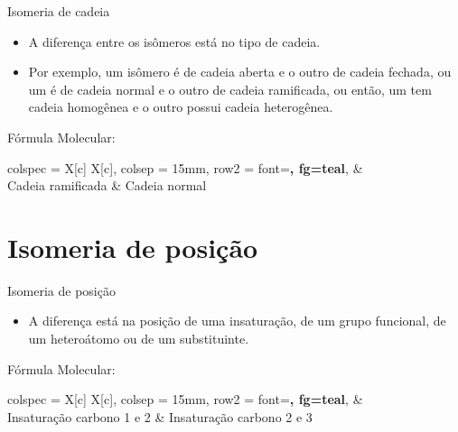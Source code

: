 \documentclass[presentation,professionalfonts,aspectratio=169]{beamer}
\begin{document}
\begin{frame}[label={sec:org221f0c5}]{Isomeria de cadeia}
\begin{itemize}
\item A diferença entre os isômeros está no tipo de cadeia.
\item Por exemplo, um isômero é de cadeia aberta e o outro de cadeia fechada, ou um é de cadeia normal e o outro de cadeia ramificada, ou então, um tem cadeia homogênea e o outro possui cadeia heterogênea.
\end{itemize}




\begin{bclogo}[couleur=yellow!30 , arrondi=0.1 , logo=\bcplume , epBarre=3.5]{Fórmula Molecular: }


\begin{tblr}
{
colspec = {X[c] X[c]},
colsep = 15mm,
row{2} = {font=\bfseries, fg=teal},
}
& 
 \\
Cadeia ramificada & Cadeia normal \\
\end{tblr}
\end{bclogo}
\end{frame}




\section{Isomeria de posição}
\label{sec:orgc78e6a9}

\begin{frame}[label={sec:org645e445}]{Isomeria de posição}
\begin{itemize}
\item A diferença está na posição de uma insaturação, de um grupo funcional, de um heteroátomo ou de um substituinte.
\end{itemize}



\begin{bclogo}[couleur=yellow!30 , arrondi=0.1 , logo=\bcplume , epBarre=3.5]{Fórmula Molecular: }


\begin{tblr}
{
colspec = {X[c] X[c]},
colsep = 15mm,
row{2} = {font=\bfseries, fg=teal},
}
& 
 \\
Insaturação carbono 1 e 2  & Insaturação carbono 2 e 3 \\
\end{tblr}
\end{bclogo}
\end{frame}
\end{document}
